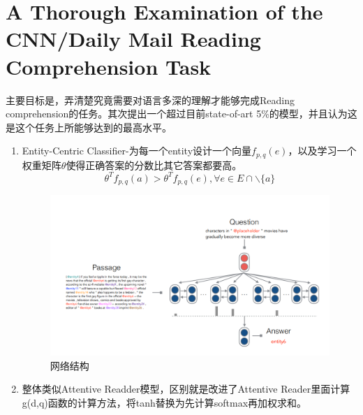 \documentclass[a4paper,UTF8]{article}
\numberwithin{equation}{section}
\begin{document}
\section{A Thorough Examination of the CNN/Daily Mail Reading Comprehension Task}
主要目标是，弄清楚究竟需要对语言多深的理解才能够完成Reading comprehension的任务。其次提出一个超过目前state-of-art 5\%的模型，并且认为这是这个任务上所能够达到的最高水平。
\begin{enumerate}
    \item Entity-Centric Classifier-为每一个entity设计一个向量$f_{p,q}(e)$，以及学习一个权重矩阵$\theta$使得正确答案的分数比其它答案都要高。
    $$\theta ^{T}f_{p,q}(a)>\theta ^{T}f_{p,q}(e),\forall e \in E \cap\backslash\{a\}$$
    \begin{figure}[H]
        \centering
        \includegraphics[width=\textwidth]{10-1.png}
        \caption{网络结构}
    \end{figure}
    \item 整体类似Attentive Readder模型，区别就是改进了Attentive Reader里面计算g(d,q)函数的计算方法，将tanh替换为先计算softmax再加权求和。
\end{enumerate}

\newpage
\end{document}
